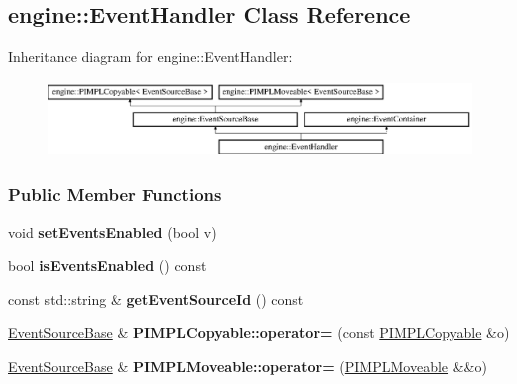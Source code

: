 \hypertarget{a00033}{}\subsection{engine\+:\+:Event\+Handler Class Reference}
\label{a00033}
Inheritance diagram for engine\+:\+:Event\+Handler\+:\begin{figure}[H]
\begin{center}
\leavevmode
\includegraphics[height=1.985816cm]{a00033}
\end{center}
\end{figure}
\subsubsection*{Public Member Functions}
\begin{DoxyCompactItemize}
\item 
void {\bfseries set\+Events\+Enabled} (bool v)\hypertarget{a00036_ae529242181c16462bef9bd6b8fb56b93}{}\label{a00036_ae529242181c16462bef9bd6b8fb56b93}

\item 
bool {\bfseries is\+Events\+Enabled} () const \hypertarget{a00036_a659325f18d666f132f380e4319499572}{}\label{a00036_a659325f18d666f132f380e4319499572}

\item 
const std\+::string \& {\bfseries get\+Event\+Source\+Id} () const \hypertarget{a00036_ad41deeb2b9de38797b10777e5d1ecf13}{}\label{a00036_ad41deeb2b9de38797b10777e5d1ecf13}

\item 
\hyperlink{a00036}{Event\+Source\+Base} \& {\bfseries P\+I\+M\+P\+L\+Copyable\+::operator=} (const \hyperlink{a00060}{P\+I\+M\+P\+L\+Copyable} \&o)\hypertarget{a00060_a26fdb9b3d449d04dc653c7ae942f452b}{}\label{a00060_a26fdb9b3d449d04dc653c7ae942f452b}

\item 
\hyperlink{a00036}{Event\+Source\+Base} \& {\bfseries P\+I\+M\+P\+L\+Moveable\+::operator=} (\hyperlink{a00061}{P\+I\+M\+P\+L\+Moveable} \&\&o)\hypertarget{a00061_ac67025e8a25edffe99fa9bf67ed8ca19}{}\label{a00061_ac67025e8a25edffe99fa9bf67ed8ca19}

\end{DoxyCompactItemize}
